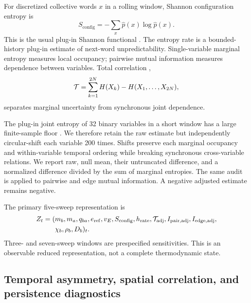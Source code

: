 \documentclass[12pt]{article}
\begin{document}
For discretized collective words $x$ in a rolling window, Shannon
configuration
entropy is
\begin{equation}
S_{\mathrm{config}}=-\sum_x \hat p(x)\log\hat p(x).
\end{equation}
This is the usual plug-in Shannon functional \cite{shannon1948}.
The entropy rate is a bounded-history plug-in estimate of next-word
unpredictability.  Single-variable marginal entropy measures local occupancy;
pairwise mutual information measures dependence between variables.  Total
correlation \cite{watanabe1960},
\begin{equation}
{\cal T}=\sum_{k=1}^{2N}H(X_k)-H(X_1,\ldots,X_{2N}),
\end{equation}
separates marginal uncertainty from synchronous joint dependence.

The plug-in joint entropy of 32 binary variables in a short window has a large
finite-sample floor \cite{paninski2003}.  We therefore retain the raw estimate
but independently circular-shift each variable 200 times.  Shifts preserve
each marginal occupancy and within-variable temporal ordering while breaking
synchronous cross-variable relations.  We report raw, null mean, their
untruncated difference, and a normalized difference divided by the sum of
marginal entropies.  The same audit is applied to pairwise and edge mutual
information.  A negative adjusted estimate remains negative.

The primary five-sweep representation is
\begin{align}
Z_t=(&m_b,m_a,q_{ba},e_{\mathrm{ref}},v_E,S_{\mathrm{config}},h_{\mathrm{rate}},
{\cal T}_{\mathrm{adj}},I_{\mathrm{pair,adj}},I_{\mathrm{edge,adj}},\nonumber\\
&\chi_b,\rho_b,D_b)_t .
\end{align}
Three- and seven-sweep windows are prespecified sensitivities.  This is an
observable reduced representation, not a complete thermodynamic state.

\subsection{Temporal asymmetry, spatial correlation, and persistence diagnostics}
\label{sec:path-asymmetry}
\end{document}
